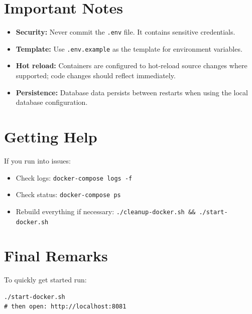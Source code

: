 \documentclass[11pt]{article}
\begin{document}
\section{Important Notes}
\begin{itemize}
	\item \textbf{Security:} Never commit the \texttt{.env} file. It contains sensitive credentials.
	\item \textbf{Template:} Use \texttt{.env.example} as the template for environment variables.
	\item \textbf{Hot reload:} Containers are configured to hot-reload source changes where supported; code changes should reflect immediately.
	\item \textbf{Persistence:} Database data persists between restarts when using the local database configuration.
\end{itemize}

\section{Getting Help}
If you run into issues:
\begin{itemize}
	\item Check logs: \texttt{docker-compose logs -f}
	\item Check status: \texttt{docker-compose ps}
	\item Rebuild everything if necessary: \texttt{./cleanup-docker.sh \&\& ./start-docker.sh}
\end{itemize}

\section*{Final Remarks}
To quickly get started run:
\begin{Verbatim}[fontsize=\small]
./start-docker.sh
# then open: http://localhost:8081
\end{Verbatim}

\vfill
{}
\end{document}
